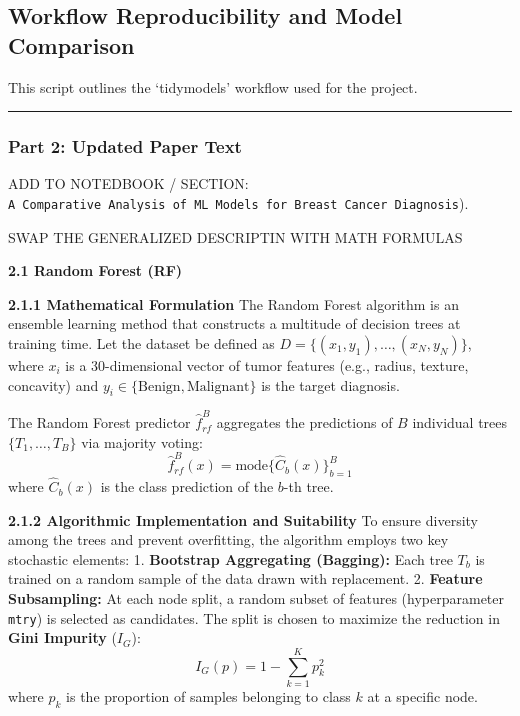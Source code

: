 \documentclass[
]{article}
\author{}
\date{\vspace{-2.5em}}
\begin{document}
\subsection{Workflow Reproducibility and Model
Comparison}\label{workflow-reproducibility-and-model-comparison}

This script outlines the `tidymodels' workflow used for the project.

\begin{center}\rule{0.5\linewidth}{0.5pt}\end{center}

\subsubsection{Part 2: Updated Paper
Text}\label{part-2-updated-paper-text}

ADD TO NOTEDBOOK / SECTION:
\texttt{A\ Comparative\ Analysis\ of\ ML\ Models\ for\ Breast\ Cancer\ Diagnosis}).

SWAP THE GENERALIZED DESCRIPTIN WITH MATH FORMULAS

\textbf{2.1 Random Forest (RF)}

\textbf{2.1.1 Mathematical Formulation} The Random Forest algorithm is
an ensemble learning method that constructs a multitude of decision
trees at training time. Let the dataset be defined as
\(D = \{(x_1, y_1), \dots, (x_N, y_N)\}\), where \(x_i\) is a
30-dimensional vector of tumor features (e.g., radius, texture,
concavity) and \(y_i \in \{ \text{Benign}, \text{Malignant} \}\) is the
target diagnosis.

The Random Forest predictor \(\hat{f}_{rf}^{B}\) aggregates the
predictions of \(B\) individual trees \(\{T_1, \dots, T_B\}\) via
majority voting:
\[\hat{f}_{rf}^{B}(x) = \text{mode} \{ \hat{C}_b(x) \}_{b=1}^{B}\] where
\(\hat{C}_b(x)\) is the class prediction of the \(b\)-th tree.

\textbf{2.1.2 Algorithmic Implementation and Suitability} To ensure
diversity among the trees and prevent overfitting, the algorithm employs
two key stochastic elements: 1. \textbf{Bootstrap Aggregating
(Bagging):} Each tree \(T_b\) is trained on a random sample of the data
drawn with replacement. 2. \textbf{Feature Subsampling:} At each node
split, a random subset of features (hyperparameter \texttt{mtry}) is
selected as candidates. The split is chosen to maximize the reduction in
\textbf{Gini Impurity} (\(I_G\)): \[I_G(p) = 1 - \sum_{k=1}^{K} p_k^2\]
where \(p_k\) is the proportion of samples belonging to class \(k\) at a
specific node.
\end{document}
